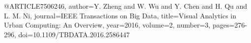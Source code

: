 @ARTICLE{7506246,
  author={Y. {Zheng} and W. {Wu} and Y. {Chen} and H. {Qu} and L. M. {Ni}},
  journal={IEEE Transactions on Big Data}, 
  title={Visual Analytics in Urban Computing: An Overview}, 
  year={2016},
  volume={2},
  number={3},
  pages={276-296},
  doi={10.1109/TBDATA.2016.2586447}}
